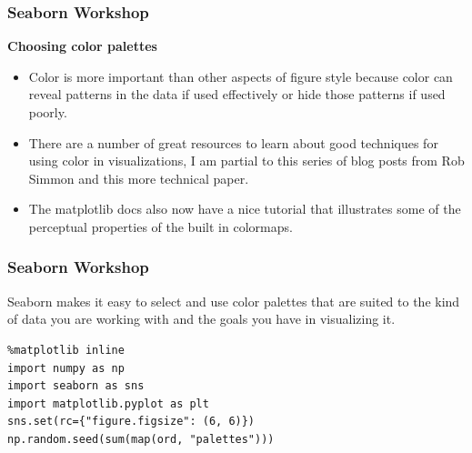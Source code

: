 \documentclass{beamer}
\begin{document}
\begin{frame}[fragile]
\frametitle{Seaborn Workshop}
\large

\noindent \textbf{Choosing color palettes}
\begin{itemize}
\item Color is more important than other aspects of figure style because color can reveal patterns in the data if used effectively or hide those patterns if used poorly. 
\item There are a number of great resources to learn about good techniques for using color in visualizations, I am partial to this series of blog posts from Rob Simmon and this more technical paper. 
\item The matplotlib docs also now have a nice tutorial that illustrates some of the perceptual properties of the built in colormaps.
\end{itemize}

\end{frame}
\begin{frame}[fragile]
\frametitle{Seaborn Workshop}
\large
Seaborn makes it easy to select and use color palettes that are suited to the kind of data you are working with and the goals you have in visualizing it.
{
	\Large
\begin{framed}
\begin{verbatim}
%matplotlib inline
import numpy as np
import seaborn as sns
import matplotlib.pyplot as plt
sns.set(rc={"figure.figsize": (6, 6)})
np.random.seed(sum(map(ord, "palettes")))
\end{verbatim}
\end{framed}
}
\end{frame}
\end{document}
